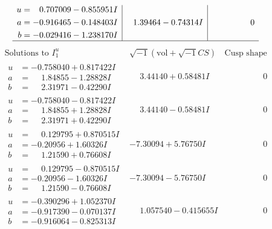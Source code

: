 \documentclass[1p]{elsarticle_modified}
\theoremstyle{definition}
\newcommand{\I}{\sqrt{-1}}
\begin{document}
$$\begin{array}{c|c|c}
\begin{aligned}
u &= \phantom{-}0.707009 - 0.855951 I \\
a &= -0.916465 - 0.148403 I \\
b &= -0.029416 - 1.238170 I\end{aligned}
 & \phantom{-}1.39464 - 0.74314 I & \phantom{-0.000000 } 0\\
 \hline 
 \end{array}$$\newpage$$\begin{array}{c|c|c}  
\text{Solutions to }I^u_{1}& \I (\text{vol} + \sqrt{-1}CS) & \text{Cusp shape}\\
 \hline 
\begin{aligned}
u &= -0.758040 + 0.817422 I \\
a &= \phantom{-}1.84855 - 1.28828 I \\
b &= \phantom{-}2.31971 - 0.42290 I\end{aligned}
 & \phantom{-}3.44140 + 0.58481 I & \phantom{-0.000000 } 0 \\ \hline\begin{aligned}
u &= -0.758040 - 0.817422 I \\
a &= \phantom{-}1.84855 + 1.28828 I \\
b &= \phantom{-}2.31971 + 0.42290 I\end{aligned}
 & \phantom{-}3.44140 - 0.58481 I & \phantom{-0.000000 } 0 \\ \hline\begin{aligned}
u &= \phantom{-}0.129795 + 0.870515 I \\
a &= -0.20956 + 1.60326 I \\
b &= \phantom{-}1.21590 + 0.76608 I\end{aligned}
 & -7.30094 + 5.76750 I & \phantom{-0.000000 } 0 \\ \hline\begin{aligned}
u &= \phantom{-}0.129795 - 0.870515 I \\
a &= -0.20956 - 1.60326 I \\
b &= \phantom{-}1.21590 - 0.76608 I\end{aligned}
 & -7.30094 - 5.76750 I & \phantom{-0.000000 } 0 \\ \hline\begin{aligned}
u &= -0.390296 + 1.052370 I \\
a &= -0.917390 - 0.070137 I \\
b &= -0.916064 - 0.825313 I\end{aligned}
 & \phantom{-}1.057540 - 0.415655 I & \phantom{-0.000000 } 0 \\ \hline\begin{aligned}

\end{aligned}
\end{array}$$
\end{document}
